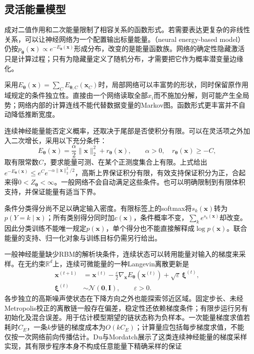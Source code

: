 \subsection{灵活能量模型}
\label{sec:pgm-energy-models-flexible}

成对二值作用和二次能量限制了相容关系的函数形式。若需要表达更复杂的非线性关系，可以让神经网络为一个配置输出标量能量。（neural energy-based model）仍按$p_{\bm{\theta}}(\bm{x})\propto e^{-E_{\bm{\theta}}(\bm{x})}$形成分布，改变的是能量函数族。网络的确定性隐藏激活只是计算过程；只有为隐藏量定义了随机分布，才需要把它作为概率潜变量边缘化。

采用$E_{\bm{\theta}}(\bm{x})=\sum_CE_{\bm{\theta},C}(\bm{x}_C)$时，局部网络可以丰富势的形状，同时保留原作用域规定的条件独立性。直接由一个网络读取全部$x_i$而不施加分解，则可能产生全局势；网络内部的计算连线不能代替数据变量的Markov图。函数形式更丰富并不自动降低推断宽度。

连续神经能量能否定义概率，还取决于尾部是否使积分有限。可以在灵活项之外加入二次增长，采用以下充分条件：
\[
  E_{\bm{\theta}}(\bm{x})
    =\frac{\alpha}{2}\lVert\bm{x}\rVert_2^2+r_{\bm{\theta}}(\bm{x}),
  \qquad \alpha>0,\quad r_{\bm{\theta}}(\bm{x})\geq-C,
\]
取有限常数$C$，要求能量可测、在某个正测度集合上有限。上式给出$e^{-E_{\bm{\theta}}(\bm{x})}\leq e^Ce^{-\alpha\lVert\bm{x}\rVert_2^2/2}$，高斯上界保证积分有限，有效支持保证积分为正，合起来得$0<Z_{\bm{\theta}}<\infty$。一般网络不会自动满足这些条件。也可以明确限制到有限体积支持，并保证能量有适当下界。

条件分类得分尚不足以确定输入密度。有限标签上的softmax将$s_k(\bm{x})$转为$p(Y=k\mid\bm{x})$；所有类别得分同时加$c(\bm{x})$，条件概率不变，$\sum_ke^{s_k(\bm{x})}$却改变。因此分类训练不能唯一规定$p(\bm{x})$，单个得分也不能直接解释成$\log p(\bm{x})$。联合能量的支持、归一化对象与训练目标仍需另行给出。

一般神经能量缺少RBM的解析块条件，连续状态可以转用能量对输入的梯度来采样。在无约束$\mathbb{R}^d$上，连续可微能量的一种Langevin离散更新是
\begin{equation}
  \begin{aligned}
    \bm{x}^{(t+1)}
      &=\bm{x}^{(t)}
        -\frac{\varepsilon}{2}
          \nabla_{\bm{x}}E_{\bm{\theta}}(\bm{x}^{(t)})
        +\sqrt{\varepsilon}\,\bm{\xi}^{(t)},\\
    \bm{\xi}^{(t)}&\sim\mathcal{N}(\bm{0},\bm{I}),
       \qquad \varepsilon>0.
  \end{aligned}
  \label{eq:pgm-energy-models-langevin}
\end{equation}
各步独立的高斯噪声使状态在下降方向之外也能探索邻近区域。固定步长、未经Metropolis校正的离散链一般存在偏差，稳定性还依赖梯度条件；有限步运行另有初始化及混合误差。用于估计模型期望的链状态称为负样本。一次能量梯度求值若耗时$C_E$，一条$k$步链的梯度成本为$O(kC_E)$；计算量应包括每步梯度求值，不能仅按一次网络前向传播估计。Du与Mordatch展示了这类连续神经能量的梯度采样实现，其有限步程序本身不构成任意能量下精确采样的保证

